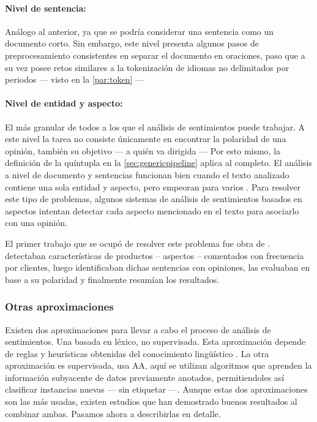 \paragraph{Nivel de sentencia:} Análogo al anterior, ya que se podría considerar
una sentencia como un documento corto. Sin embargo, este nivel presenta algunos
pasos de preprocesamiento consistentes en separar el documento en oraciones,
paso que a su vez posee retos similares a la tokenización de idiomas no
delimitados por periodos --- visto en la  \autoref{par:token} ---

\paragraph{Nivel de entidad y aspecto:} El más granular de todos a los que el
análisis de sentimientos puede trabajar. A este nivel la tarea no consiste
únicamente en encontrar la polaridad de una opinión, también su objetivo --- a
quién va dirigida --- Por esto mismo, la definición de la quíntupla en la
\autoref{sec:genericpipeline} aplica al completo. El análisis a nivel de
documento y sentencias funcionan bien cuando el texto analizado contiene una
sola entidad y aspecto, pero empeoran para varios \cite{Feldman2013}. Para
resolver este tipo de problemas, algunos sistemas de análisis de sentimientos
basados en aspectos intentan detectar cada aspecto mencionado en el texto para
asociarlo con una opinión.

El primer trabajo que se ocupó de resolver este problema fue obra de
\citet{Hu2004}. \citeauthor{Hu2004} detectaban características de productos --
aspectos -- comentados con frecuencia por clientes, luego identificaban dichas
sentencias con opiniones, las evaluaban en base a su polaridad y finalmente
resumían los resultados.

\subsubsection{Otras aproximaciones}
\label{sec:approaches}

Existen dos aproximaciones para llevar a cabo el proceso de análisis de
sentimientos. Una basada en léxico, no supervisada. Esta aproximación depende
de reglas y heurísticas obtenidas del conocimiento lingüístico
\cite{VILARES2013}. La otra aproximación es supervisada, usa \ac{AA}, aquí se
utilizan algoritmos que aprenden la información subyacente de datos previamente
anotados, permitiendoles así clasificar instancias nuevas --- sin etiquetar
\cite{Pang2002} ---. Aunque estas dos aproximaciones son las más usadas, existen
estudios que han demostrado buenos resultados al combinar ambas. Pasamos ahora a
describirlas en detalle.

